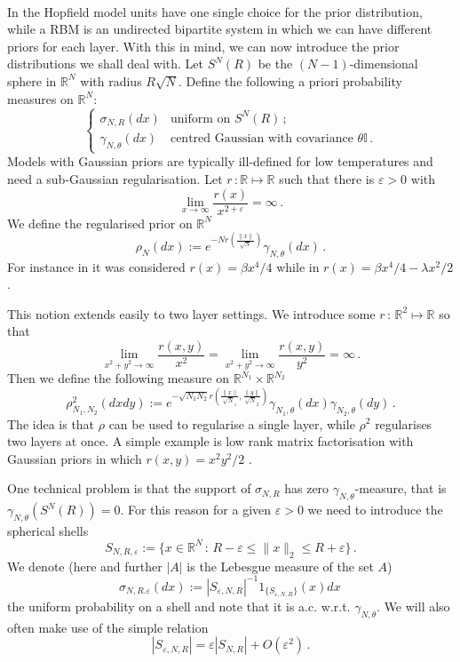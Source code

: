 \documentclass[10pt,oneside,a4paper,reqno]{amsart}  %
\newcommand{\OOO}[1]{O \left(#1\right)}
\def\be{\begin{equation}}
\def\ee{\end{equation}}
\def\e{\varepsilon}
\def\g{\gamma}
\def\b{\beta}
\def\l{\lambda}
\def\r{\rho}
\def\s{\sigma}
\def\R{\mathbb{R}}
\theoremstyle{plain}
\numberwithin{equation}{section}
\begin{document}
\

In the Hopfield model units have one single choice for the prior distribution, while a RBM is an undirected bipartite system in which we can have different priors for each layer. With this in mind, we can now introduce the prior distributions we shall deal with. Let $S^{N}(R)$ be the $(N-1)$-dimensional sphere in $\R^N$ with radius $R\sqrt N$. Define the following a priori probability measures on $\R^N$:
\be\label{eq:prior}
\begin{cases}
\s_{N,R}(dx)&\mbox{uniform on $S^N(R)$}\,;\\
\g_{N,\theta}(dx)&\mbox{centred Gaussian with covariance $\theta \mathbb I$}\,.
\end{cases}
\ee
Models with Gaussian priors are typically ill-defined for low temperatures and need a sub-Gaussian regularisation. Let  $r\,:\R\mapsto\R$ such that there is $\e>0$ with
$$
\lim_{x\to\infty}\frac{r(x)}{x^{2+\e}}=\infty\,.
$$
We define the regularised prior on $\R^N$
\be\label{eq:Reg-prior1}
\r_N(dx):= e^{-Nr\left(\frac{\|x\|}{\sqrt N}\right)}\g_{N,\theta}(dx)\,. 
\ee
For instance in \cite{BDG} it was considered $r(x)=\b x^4/4$ while in \cite{gauss,legendre} $r(x)=\b x^4/4-\l x^2/2$. 

This notion extends easily to two layer settings. We introduce some $r\,:\,\R^2\mapsto \R$ so that
$$
\lim_{x^2+y^2\to\infty} \frac{r(x,y)}{x^2}=\lim_{x^2+y^2\to\infty} \frac{r(x,y)}{y^2}=\infty\,.
$$
Then we define the following measure on $\R^{N_1}\times \R^{N_2}$
\be\label{eq:Reg-prior2}
\r^2_{N_1,N_2}(dxdy):= e^{-\sqrt{N_1N_2}r\left(\frac{\|x\|}{\sqrt N_1},\frac{\|y\|}{\sqrt N_2}\right)}\g_{N_1,\theta}(dx)\g_{N_2,\theta}(dy)\,. 
\ee
The idea is that $\r$ can be used to regularise a single layer, while $\r^2$ regularises two layers at once. A simple example is low rank matrix factorisation with Gaussian priors in which $r(x,y)=x^2y^2/2$ \cite{leo}. 

One technical problem is that the support of $\s_{N,R}$ has zero $\g_{N,\theta}$-measure, that is $\g_{N,\theta}(S^{N}(R))=0$. For this reason for a given $\e>0$ we need to introduce the spherical shells
\be\label{eq:Sfshell}
S_{N,R,\e}:=\{x\in\R^N\,:\,R-\e\leq\|x\|_2\leq R+\e\}\,.
\ee
We denote (here and further $|A|$ is the Lebesgue measure of the set $A$)
$$
\s_{N,R.\e}(dx):=|S_{\e,N,R}|^{-1}1_{\{S_{\e,N,R}\}}(x)dx\,
$$
the uniform probability on a shell and note that it is a.c. w.r.t. $\g_{N,\theta}$. We will also often make use of the simple relation
\be\label{eq:shells-surface}
|S_{\e,N,R}|=\e|S_{N,R}|+\OOO{\e^2}\,.
\ee
\end{document}
